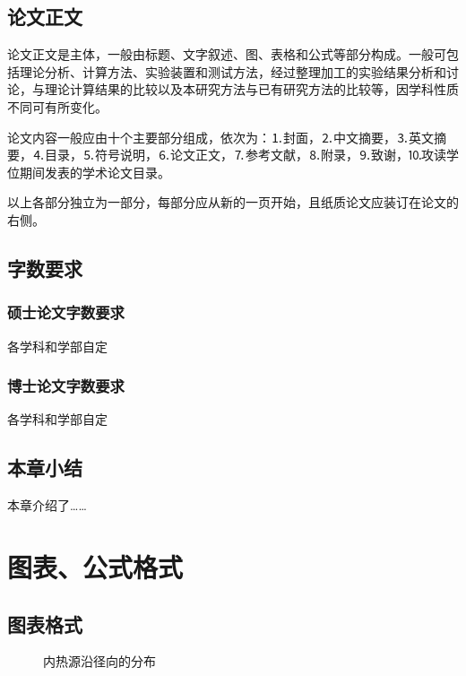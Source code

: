 \documentclass[UTF8,a4paper,12pt]{ctexart}
\numberwithin{equation}{section}
\begin{document}
\subsection{论文正文}
论文正文是主体，一般由标题、文字叙述、图、表格和公式等部分构成。一般可包括理论分析、计算方法、实验装置和测试方法，经过整理加工的实验结果分析和讨论，与理论计算结果的比较以及本研究方法与已有研究方法的比较等，因学科性质不同可有所变化。\par
论文内容一般应由十个主要部分组成，依次为：⒈封面，⒉中文摘要，⒊英文摘要，⒋目录，⒌符号说明，⒍论文正文，⒎参考文献，⒏附录，⒐致谢，⒑攻读学位期间发表的学术论文目录。\par
以上各部分独立为一部分，每部分应从新的一页开始，且纸质论文应装订在论文的右侧。\par
\subsection{字数要求}
\subsubsection{硕士论文字数要求}
各学科和学部自定
\subsubsection{博士论文字数要求}
各学科和学部自定
\subsection{本章小结}
本章介绍了……

\newpage
{}
\section{图表、公式格式}
\subsection{图表格式}

\begin{figure}[htb] 
\caption{内热源沿径向的分布}
\end{figure}
\end{document}
